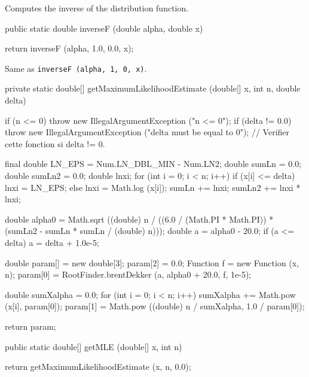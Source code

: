   \begin{tabb}
  Computes  the inverse of the distribution function.
 \end{tabb}
\begin{code}

   public static double inverseF (double alpha, double x)\begin{hide} {
      return inverseF (alpha, 1.0, 0.0, x);
   }\end{hide}
\end{code}
\begin{tabb} Same as \texttt{inverseF (alpha, 1, 0, x)}.
\end{tabb}
\begin{code}\begin{hide}
   private static double[] getMaximumLikelihoodEstimate (double[] x, int n,
                                                         double delta) {
      if (n <= 0)
         throw new IllegalArgumentException ("n <= 0");
      if (delta != 0.0)
         throw new IllegalArgumentException ("delta must be equal to 0");
// Verifier cette fonction si delta != 0.

      final double LN_EPS = Num.LN_DBL_MIN - Num.LN2;
      double sumLn = 0.0;
      double sumLn2 = 0.0;
      double lnxi;
      for (int i = 0; i < n; i++) {
         if (x[i] <= delta)
            lnxi = LN_EPS;
         else
            lnxi = Math.log (x[i]);
         sumLn += lnxi;
         sumLn2 += lnxi * lnxi;
      }

      double alpha0 = Math.sqrt ((double) n / ((6.0 / (Math.PI * Math.PI)) *
                  (sumLn2 - sumLn * sumLn / (double) n)));
      double a = alpha0 - 20.0;
      if (a <= delta)
         a = delta + 1.0e-5;

      double param[] = new double[3];
      param[2] = 0.0;
      Function f = new Function (x, n);
      param[0] = RootFinder.brentDekker (a, alpha0 + 20.0, f, 1e-5);

      double sumXalpha = 0.0;
      for (int i = 0; i < n; i++)
         sumXalpha += Math.pow (x[i], param[0]);
      param[1] = Math.pow ((double) n / sumXalpha, 1.0 / param[0]);

      return param;
   }\end{hide}

   public static double[] getMLE (double[] x, int n)\begin{hide}
   {
      return getMaximumLikelihoodEstimate (x, n, 0.0);
   }\end{hide}
\end{code}
